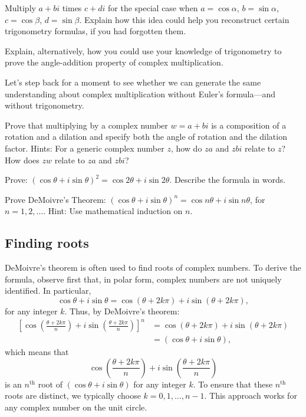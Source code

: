 \documentclass[space,nooutcomes]{ximera}
\begin{document}
\begin{problem}
Multiply $a + bi$ times $c + di$ for the special case when $a=\cos\alpha$, $b=\sin\alpha$, 
$c=\cos\beta$, $d=\sin\beta$.  Explain how this idea could help you reconstruct certain trigonometry formulas, if you had forgotten them.  

Explain, alternatively, how you could use your knowledge of trigonometry to prove the angle-addition property of complex multiplication.  
\end{problem}

%
%
Let's step back for a moment to see whether we can generate the same understanding about complex multiplication without Euler's formula---and without trigonometry.  
\begin{problem}
Prove that multiplying by a complex number $w = a + bi$ is a composition of a rotation and a dilation and specify both the angle of rotation and the dilation factor.  Hints: For a generic complex number $z$, how do $za$ and $zbi$ relate to $z$?  How does $zw$ relate to $za$ and $zbi$?  
\end{problem}

\begin{problem}
Prove:  $(\cos\theta + i\sin\theta)^2=\cos 2\theta + i\sin 2\theta$.  Describe the formula in words.    
\end{problem}

\begin{problem}
Prove DeMoivre's Theorem:  $(\cos\theta + i\sin\theta)^n=\cos n\theta + i\sin n\theta$, for $n=1, 2, \dots$.  Hint: Use mathematical induction on $n$. 
\end{problem}

\subsection*{Finding roots}
DeMoivre's theorem is often used to find roots of complex numbers.  
To derive the formula, observe first that, in polar form, complex numbers are not uniquely identified.  In particular, 
\[
\cos\theta + i\sin\theta =\cos (\theta+2k\pi) + i\sin (\theta+2k\pi), 
\]
for any integer $k$. Thus, by DeMoivre's theorem:  
\begin{align*}
\left[ \cos \left(\frac{\theta+2k\pi}{n}\right) 
+ i\sin \left(\frac{\theta+2k\pi}{n}\right) \right]^n 
&= \cos (\theta+2k\pi) + i\sin (\theta+2k\pi) \\
&= (\cos\theta + i\sin\theta), 
\end{align*}
which means that 
\[
\cos \left(\frac{\theta+2k\pi}{n}\right) 
+ i\sin \left(\frac{\theta+2k\pi}{n}\right)
\]
is an $n^\text{th}$ root of $(\cos\theta + i\sin\theta)$ for any integer $k$.  To ensure that these $n^\text{th}$ roots are distinct, we typically choose $k= 0, 1, \dots, n-1$.  This approach works for any complex number on the unit circle.  
\end{document}
